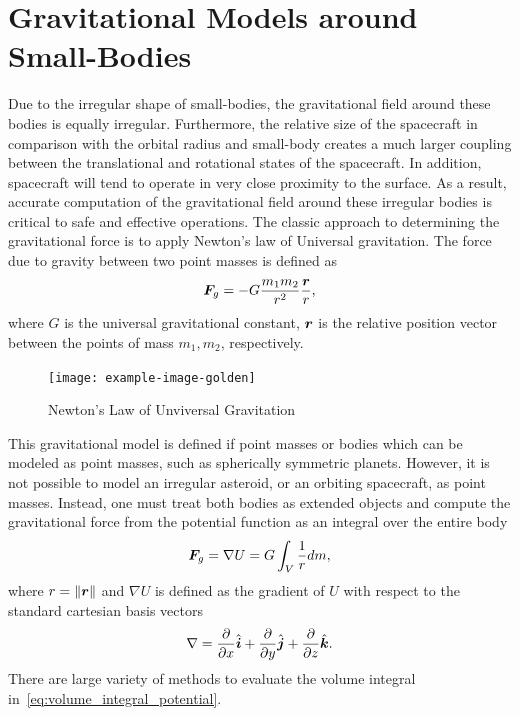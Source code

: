 \section{Gravitational Models around Small-Bodies}
Due to the irregular shape of small-bodies, the gravitational field around these bodies is equally irregular.
Furthermore, the relative size of the spacecraft in comparison with the orbital radius and small-body creates a much larger coupling between the translational and rotational states of the spacecraft.
In addition, spacecraft will tend to operate in very close proximity to the surface.
As a result, accurate computation of the gravitational field around these irregular bodies is critical to safe and effective operations.
The classic approach to determining the gravitational force is to apply Newton's law of Universal gravitation.
The force due to gravity between two point masses is defined as
\begin{align}\label{eq:newton_universal_gravitation}
    \bm{F}_g =  - G \frac{m_1 m_2}{r^2} \frac{\bm{r}}{r},
\end{align}
where \( G \) is the universal gravitational constant, \( \bm{r} \) is the relative position vector between the points of mass \( m_1, m_2\), respectively.

\begin{figure}
    \centering
    \texttt{[image: example-image-golden]}
    \caption{Newton's Law of Unviversal Gravitation~\label{fig:universal_gravity}}
\end{figure}

This gravitational model is defined if point masses or bodies which can be modeled as point masses, such as spherically symmetric planets.
However, it is not possible to model an irregular asteroid, or an orbiting spacecraft, as point masses.
Instead, one must treat both bodies as extended objects and compute the gravitational force from the potential function as an integral over the entire body
\begin{align}\label{eq:volume_integral_potential}
    \bm{F}_g = \nabla U = G \int_V \frac{1}{r} dm,
\end{align}
where \( r = \left\| \bm{r} \right\| \) and \( \nabla U \) is defined as the gradient of \( U \) with respect to the standard cartesian basis vectors
\begin{align*}
    \nabla = \frac{\partial }{\partial x} \hat{\bm{i}} + \frac{\partial }{\partial y} \hat{\bm{j}} + \frac{\partial }{\partial z} \hat{\bm{k}}.
\end{align*}
There are large variety of methods to evaluate the volume integral in~\cref{eq:volume_integral_potential}.

